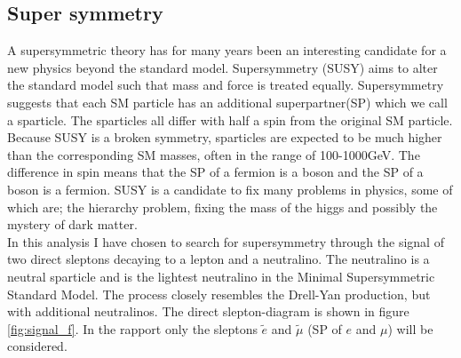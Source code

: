 \documentclass{article}
\begin{document}
\subsection{Super symmetry}\label{sec:SUSY}
A supersymmetric theory has for many years been an interesting candidate for a new physics beyond the standard model. Supersymmetry (SUSY) aims to alter the standard model such that mass and force is treated equally. Supersymmetry suggests that each SM particle has an additional superpartner(SP) which we call a sparticle. The sparticles all differ with half a spin from the original SM particle. Because SUSY is a broken symmetry, sparticles are expected to be much higher than the corresponding SM masses, often in the range of 100-1000GeV. The difference in spin means that the SP of a fermion is a boson and the SP of a boson is a fermion. SUSY is a candidate to fix many problems in physics, some of which are; the hierarchy problem, fixing the mass of the higgs and possibly the mystery of dark matter.
\\
In this analysis I have chosen to search for supersymmetry through the signal of two direct sleptons decaying to a lepton and a neutralino. The neutralino is a neutral sparticle and is the lightest neutralino in the Minimal Supersymmetric Standard Model. The process closely resembles the Drell-Yan production, but with additional neutralinos. The direct slepton-diagram is shown in figure \ref{fig:signal_f}. In the rapport only the sleptons $\tilde{e}$ and $\tilde{\mu}$ (SP of ${e}$ and ${\mu}$) will be considered.
\\
\end{document}
